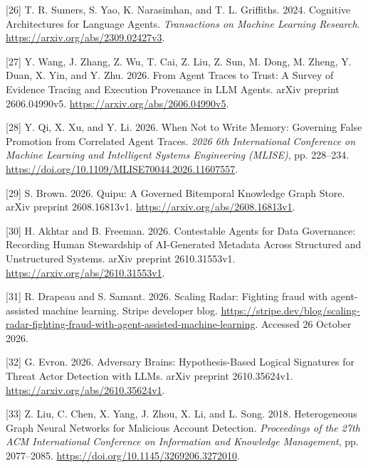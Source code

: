 \documentclass[acmlarge,review,anonymous,nonacm]{acmart}
\newlength{\cslhangindent}
\newlength{\cslentryspacingunit} %
\newenvironment{CSLReferences}[2] %
 {\bibliofont %
  \setlength{\parindent}{0pt}
  \ifodd #1
  \let\oldpar\par
  \def\par{\hangindent=\cslhangindent\oldpar}
  \fi
  \setlength{\parskip}{#2\cslentryspacingunit}
 }%
 {}
\begin{document}
\begin{CSLReferences}{1}{1}
\leavevmode{}%
{[}26{]} T. R. Sumers, S. Yao, K. Narasimhan, and T. L. Griffiths. 2024.
Cognitive Architectures for Language Agents. \emph{Transactions on
Machine Learning Research}. \url{https://arxiv.org/abs/2309.02427v3}.

\leavevmode{}%
{[}27{]} Y. Wang, J. Zhang, Z. Wu, T. Cai, Z. Liu, Z. Sun, M. Dong, M.
Zheng, Y. Duan, X. Yin, and Y. Zhu. 2026. From Agent Traces to Trust: A
Survey of Evidence Tracing and Execution Provenance in LLM Agents. arXiv
preprint 2606.04990v5. \url{https://arxiv.org/abs/2606.04990v5}.

\leavevmode{}%
{[}28{]} Y. Qi, X. Xu, and Y. Li. 2026. When Not to Write Memory:
Governing False Promotion from Correlated Agent Traces. \emph{2026 6th
International Conference on Machine Learning and Intelligent Systems
Engineering (MLISE)}, pp. 228--234.
\url{https://doi.org/10.1109/MLISE70044.2026.11607557}.

\leavevmode{}%
{[}29{]} S. Brown. 2026. Quipu: A Governed Bitemporal Knowledge Graph
Store. arXiv preprint 2608.16813v1.
\url{https://arxiv.org/abs/2608.16813v1}.

\leavevmode{}%
{[}30{]} H. Akhtar and B. Freeman. 2026. Contestable Agents for Data
Governance: Recording Human Stewardship of AI-Generated Metadata Across
Structured and Unstructured Systems. arXiv preprint 2610.31553v1.
\url{https://arxiv.org/abs/2610.31553v1}.

\leavevmode{}%
{[}31{]} R. Drapeau and S. Samant. 2026. Scaling Radar: Fighting fraud
with agent-assisted machine learning. Stripe developer blog.
\url{https://stripe.dev/blog/scaling-radar-fighting-fraud-with-agent-assisted-machine-learning}.
Accessed 26 October 2026.

\leavevmode{}%
{[}32{]} G. Evron. 2026. Adversary Brains: Hypothesis-Based Logical
Signatures for Threat Actor Detection with LLMs. arXiv preprint
2610.35624v1. \url{https://arxiv.org/abs/2610.35624v1}.

\leavevmode{}%
{[}33{]} Z. Liu, C. Chen, X. Yang, J. Zhou, X. Li, and L. Song. 2018.
Heterogeneous Graph Neural Networks for Malicious Account Detection.
\emph{Proceedings of the 27th ACM International Conference on
Information and Knowledge Management}, pp. 2077--2085.
\url{https://doi.org/10.1145/3269206.3272010}.


\end{CSLReferences}
\end{document}
